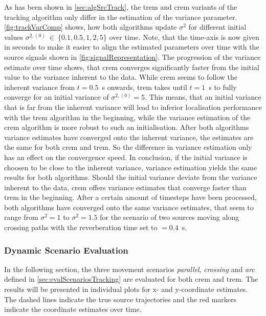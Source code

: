 As has been shown in \autoref{sec:algSrcTrack}, the \gls{trem} and \gls{crem} variants of the tracking algorithm only differ in the estimation of the variance parameter. \autoref{fig:trackVarComp} shows, how both algorithms update $\sigma^2$ for different initial values $\sigma^{2,(0)}\ \in\ \{0.1, 0.5, 1, 2, 5\}$ over time. Note, that the time-axis is now given in seconds to make it easier to align the estimated parameters over time with the source signals shown in \autoref{fig:signalRepresentation}. The progression of the variance estimate over time shows, that \gls{crem} converges significantly faster from the initial value to the variance inherent to the data. While \gls{crem} seems to follow the inherent variance from $t=0.5$~s onwards, \gls{trem} takes until $t=1$~s to fully converge for an initial variance of $\sigma^{2,(0)}=5$. This means, that an initial variance that is far from the inherent variance will lead to inferior localisation performance with the \gls{trem} algorithm in the beginning, while the variance estimation of the \gls{crem} algorithm is more robust to such an initialisation. After both algorithms variance estimates have converged onto the inherent variance, the estimates are the same for both \gls{crem} and \gls{trem}. So the difference in variance estimation only has an effect on the convergence speed. In conclusion, if the initial variance is choosen to be close to the inherent variance, variance estimation yields the same results for both algorithms. Should the initial variance deviate from the variance inherent to the data, \gls{crem} offers variance estimates that converge faster than \gls{trem} in the beginning. After a certain amount of timesteps have been processed, both algorithms have converged onto the same variance estimates, that seem to range from $\sigma^2=1$ to $\sigma^2=1.5$ for the scenario of two sources moving along crossing paths with the reverberation time set to \Tsixty$=0.4$~s.


\setlength{\figureheight}{4cm}

\subsubsection{Dynamic Scenario Evaluation}

In the following section, the three movement scenarios \emph{parallel}, \emph{crossing} and \emph{arc} defined in \autoref{sec:evalScenariosTracking} are evaluated for both \gls{crem} and \gls{trem}. The results will be presented in individual plots for x- and y-coordinate estimates. The dashed lines indicate the true source trajectories and the red markers indicate the coordinate estimates over time.

